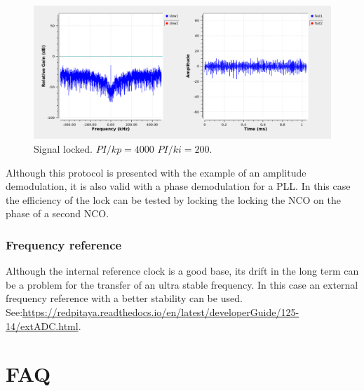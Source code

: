 \documentclass[12pt,oneside]{article}
\begin{document}
\begin{enumerate}
\begin{figure}[h!tb]
	\begin{center}
		\vspace{0.5cm}
		\includegraphics[width=13cm,trim={0cm 0cm 0cm 0cm}, clip]{figures/1amplocked.png}
		\caption{Signal locked. $PI/kp=4000$ $PI/ki=200$.}
		\label{fig:3ampdemod.png}
	\end{center}
\end{figure}
	
\end{enumerate}
\vspace{0.3cm}

Although this protocol is presented with the example of an amplitude demodulation, it is also valid with a phase demodulation for a PLL. In this case the efficiency of the lock can be tested by locking the locking the NCO on the phase of a second NCO. 

\subsubsection{Frequency reference}

Although the internal reference clock is a good base, its drift in the long term can be a problem for the transfer of an ultra stable frequency. In this case an external frequency reference with a better stability can be used. See:\newline \href{https://redpitaya.readthedocs.io/en/latest/developerGuide/125-14/extADC.html}{https://redpitaya.readthedocs.io/en/latest/developerGuide/125-14/extADC.html}.

\section{FAQ}
\end{document}
